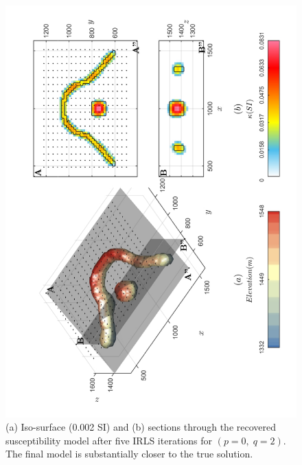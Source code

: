  \newpage
\begin{figure}[h!]
\centering
\includegraphics[scale=0.52, angle =270]{3D_Inv_l0l2_model_INDUCED.pdf}
\caption{ (a) Iso-surface (0.002 SI) and (b) sections through the recovered susceptibility model after five IRLS iterations for $(p = 0,\; q = 2)$. The final model is substantially closer to the true solution.}
\label{fig:3D_Inv_l0l2_model_INDUCED}
\end{figure}
